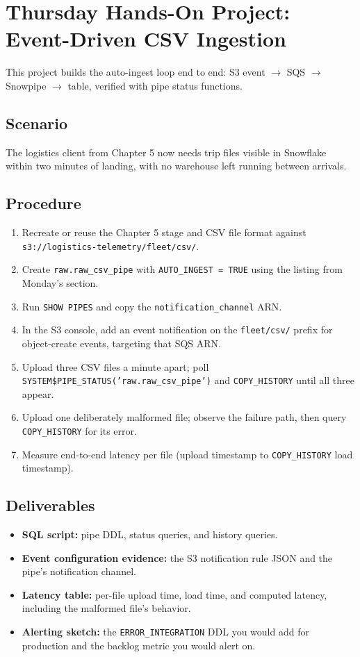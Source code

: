 \section{Thursday Hands-On Project: Event-Driven CSV Ingestion}
This project builds the auto-ingest loop end to end: S3 event $\rightarrow$ SQS $\rightarrow$ Snowpipe $\rightarrow$ table, verified with pipe status functions.

\subsection*{Scenario}
The logistics client from Chapter 5 now needs trip files visible in Snowflake within two minutes of landing, with no warehouse left running between arrivals.

\subsection*{Procedure}
\begin{enumerate}
    \item Recreate or reuse the Chapter 5 stage and CSV file format against \texttt{s3://logistics-telemetry/fleet/csv/}.
    \item Create \texttt{raw.raw\_csv\_pipe} with \texttt{AUTO\_INGEST = TRUE} using the listing from Monday's section.
    \item Run \texttt{SHOW PIPES} and copy the \texttt{notification\_channel} ARN.
    \item In the S3 console, add an event notification on the \texttt{fleet/csv/} prefix for object-create events, targeting that SQS ARN.
    \item Upload three CSV files a minute apart; poll \texttt{SYSTEM\$PIPE\_STATUS('raw.raw\_csv\_pipe')} and \texttt{COPY\_HISTORY} until all three appear.
    \item Upload one deliberately malformed file; observe the failure path, then query \texttt{COPY\_HISTORY} for its error.
    \item Measure end-to-end latency per file (upload timestamp to \texttt{COPY\_HISTORY} load timestamp).
\end{enumerate}

\subsection*{Deliverables}
\begin{itemize}
    \item \textbf{SQL script:} pipe DDL, status queries, and history queries.
    \item \textbf{Event configuration evidence:} the S3 notification rule JSON and the pipe's notification channel.
    \item \textbf{Latency table:} per-file upload time, load time, and computed latency, including the malformed file's behavior.
    \item \textbf{Alerting sketch:} the \texttt{ERROR\_INTEGRATION} DDL you would add for production and the backlog metric you would alert on.
\end{itemize}

